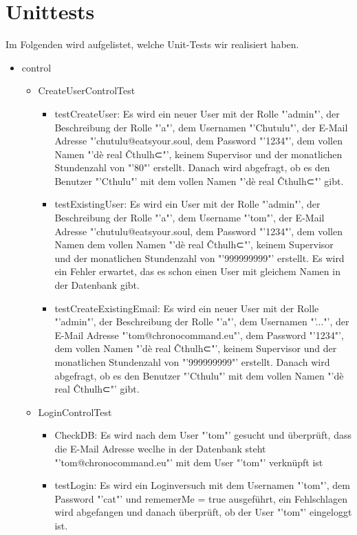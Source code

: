 \section{Unittests}
Im Folgenden wird aufgelistet, welche Unit-Tests wir realisiert haben.

\begin{itemize}
  \item control
    \begin{itemize}
      \item CreateUserControlTest
        \begin{itemize} 
          \item testCreateUser: Es wird ein neuer User mit der Rolle "'admin"', der Beschreibung der Rolle "'a"', dem Usernamen   "'Chutulu"', der E-Mail Adresse "'chutulu@eatsyour.soul, dem Password "'1234"', dem vollen Namen "'dè real Ĉthulh⊂"', keinem Supervisor und der monatlichen Stundenzahl von "'80"' erstellt. Danach wird abgefragt, ob es den Benutzer "'Cthulu"' mit dem vollen Namen "'dè real Ĉthulh⊂"' gibt.
      \item testExistingUser: Es wird ein User mit der Rolle "'admin"', der Beschreibung der Rolle "'a"', dem Username "'tom"', der E-Mail Adresse "'chutulu@eatsyour.soul, dem Password "'1234"', dem vollen Namen dem vollen Namen "'dè real Ĉthulh⊂"', keinem Supervisor und der monatlichen Stundenzahl von "'999999999"' erstellt. Es wird ein Fehler erwartet, das es schon einen User mit gleichem Namen in der Datenbank gibt. 
           \item testCreateExistingEmail: Es wird ein neuer User mit der Rolle "'admin"', der Beschreibung der Rolle "'a"', dem Usernamen   "'..."', der E-Mail Adresse "'tom@chronocommand.eu"', dem Password "'1234"', dem vollen Namen "'dè real Ĉthulh⊂"', keinem Supervisor und der monatlichen Stundenzahl von "'999999999"' erstellt. Danach wird abgefragt, ob es den Benutzer "'Cthulu"' mit dem vollen Namen "'dè real Ĉthulh⊂"' gibt.
          \end{itemize}
        \item LoginControlTest
          \begin{itemize}
            \item CheckDB: Es wird nach dem User "'tom"' gesucht und überprüft, dass die E-Mail Adresse weclhe in der Datenbank steht "'tom@chronocommand.eu"' mit dem User "'tom"' verknüpft ist
            \item testLogin: Es wird ein Loginversuch mit dem Usernamen "'tom"', dem Password "'cat"' und rememerMe = true ausgeführt, ein Fehlschlagen wird abgefangen und danach überprüft, ob der User "'tom"' eingeloggt ist.

\end{itemize}
\end{itemize}
\end{itemize}
